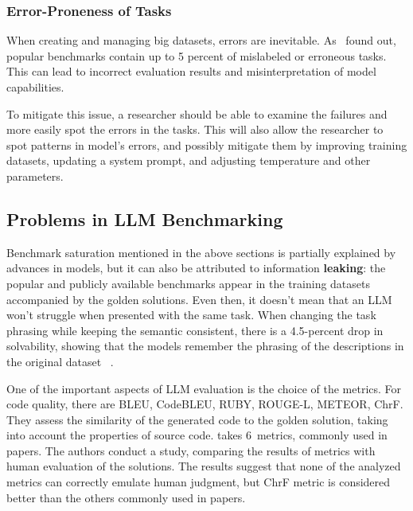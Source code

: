 \subsubsection{Error-Proneness of Tasks}

When creating and managing big datasets, errors are inevitable.
As~\cite{vendrow2025largelanguagemodelbenchmarks} found out, popular benchmarks contain up to 5 percent of mislabeled or erroneous tasks.
This can lead to incorrect evaluation results and misinterpretation of model capabilities.

To mitigate this issue, a researcher should be able to examine the failures and more easily spot the errors in the tasks.
This will also allow the researcher to spot patterns in model's errors, and possibly mitigate them by improving training datasets, updating a system prompt, and adjusting temperature and other parameters.

\subsection{Problems in LLM Benchmarking}


Benchmark saturation mentioned in the above sections is partially explained by advances in models, but it can also be attributed to information \textbf{leaking}: the popular and publicly available benchmarks appear in the training datasets accompanied by the golden solutions.
Even then, it doesn't mean that an LLM won't struggle when presented with the same task.
When changing the task phrasing while keeping the semantic consistent, there is a 4.5-percent drop in solvability, showing that the models remember the phrasing of the descriptions in the original dataset~ \cite{uniyal2024one}.

One of the important aspects of LLM evaluation is the choice of the metrics.
For code quality, there are BLEU, CodeBLEU, RUBY, ROUGE-L, METEOR, ChrF\@.
They assess the similarity of the generated code to the golden solution, taking into account the properties of source code.
\cite{evtikhiev2023out} takes 6~metrics, commonly used in papers.
The authors conduct a study, comparing the results of metrics with human evaluation of the solutions.
The results suggest that none of the analyzed metrics can correctly emulate human judgment, but ChrF metric is considered better than the others commonly used in papers.

